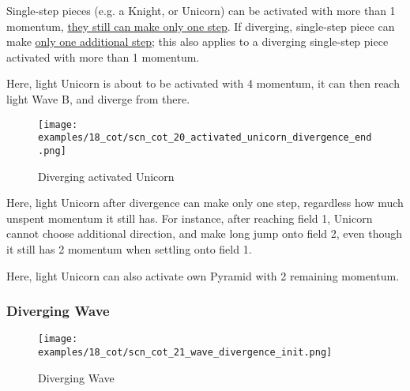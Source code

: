 \vspace*{-0.4\baselineskip}
Single-step pieces (e.g. a Knight, or Unicorn) can be activated with more than 1 momentum,
\hyperref[fig:scn_mv_30_single_step_piece_momentum]{they still can make only one step}.
If diverging, single-step piece can make
\hyperref[fig:scn_cot_15_diverging_unicorn_init]{only one additional step}; this also
applies to a diverging single-step piece activated with more than 1 momentum.

Here, light Unicorn is about to be activated with 4 momentum, it can then reach light Wave
B, and diverge from there.

\clearpage %

\vspace*{-2.1\baselineskip}
\noindent
\begin{figure}[!h]
\texttt{[image: examples/18\_cot/scn\_cot\_20\_activated\_unicorn\_divergence\_end.png]}
\vspace*{-1.3\baselineskip}
\caption{Diverging activated Unicorn}
\label{fig:scn_cot_20_activated_unicorn_divergence_end}
\end{figure}

\vspace*{-0.4\baselineskip}
Here, light Unicorn after divergence can make only one step, regardless how much
unspent momentum it still has. For instance, after reaching field 1, Unicorn cannot
choose additional direction, and make long jump onto field 2, even though it still
has 2 momentum when settling onto field 1.

Here, light Unicorn can also activate own Pyramid with 2 remaining momentum.

\clearpage %

\subsubsection*{Diverging Wave}
\label{sec:Conquest of Tlalocan/Shaman/Divergence/Diverging Wave}

\vspace*{-1.4\baselineskip}
\noindent
\begin{figure}[!h]
\texttt{[image: examples/18\_cot/scn\_cot\_21\_wave\_divergence\_init.png]}
\vspace*{-1.3\baselineskip}
\caption{Diverging Wave}
\label{fig:scn_cot_21_wave_divergence_init}
\end{figure}

